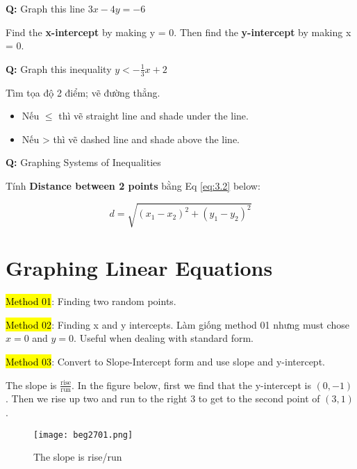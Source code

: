 \textbf{Q:} Graph this line \(3x-4y=-6\)

Find the \textbf{x-intercept} by making y = 0. Then find the \textbf{y-intercept} by making x = 0.

\vspace{5mm}

\textbf{Q:} Graph this inequality \(y < -\frac{1}{3}x+2\)

Tìm tọa độ 2 điểm; vẽ đường thẳng.

\begin{itemize}
  \item Nếu \(\le\) thì vẽ straight line and shade under the line.
  \item Nếu > thì vẽ dashed line and shade above the line.
\end{itemize}

\textbf{Q: }Graphing Systems of Inequalities

\vspace{5mm}

Tính \textbf{Distance between 2 points} bằng Eq \ref{eq:3.2} below:

\begin{equation}
  d = \sqrt{(x_{1}-x_{2})^{2} + (y_{1}-y_{2})^{2}}
  \label{eq:3.2}
\end{equation}

\section{Graphing Linear Equations}

\hl{Method 01}: Finding two random points.

\hl{Method 02}: Finding x and y intercepts. Làm giống method 01 nhưng must chose $x=0$ and $y=0$. Useful when dealing with standard form.


\hl{Method 03}: Convert to Slope-Intercept form and use slope and y-intercept.

The slope is $\frac{\text{rise}}{\text{run}}$. In the figure below, first we find that the y-intercept is $(0,-1)$. Then we rise up two and run to the right 3 to get to the second point of $(3,1)$.

\begin{figure}[htb!]
  \centering
  \texttt{[image: beg2701.png]}
  \caption{The slope is rise/run}
\end{figure}

\newpage


